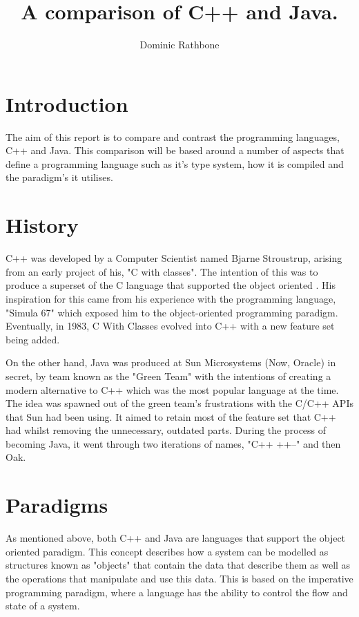 \documentclass[]{report}
\title{A comparison of C++ and Java.}
\author{Dominic Rathbone}
\begin{document}
\maketitle
\section{Introduction}
The aim of this report is to compare and contrast the programming languages, C++ and Java. This comparison will be based around a number of aspects that define a programming language such as it's type system, how it is compiled and the paradigm's it utilises.

\section{History}
C++ was developed by a Computer Scientist named Bjarne Stroustrup, arising from an early project of his, "C with classes". The intention of this was to produce a superset of the C language that supported the object oriented . His inspiration for this came from his experience with the programming language, "Simula 67" which exposed him to the object-oriented programming paradigm. Eventually, in 1983, C With Classes evolved into C++ with a new feature set being added. \cite{HistoryC++}

On the other hand, Java was produced at Sun Microsystems (Now, Oracle) in secret, by team known as the "Green Team" with the intentions of creating a modern alternative to C++ which was the most popular language at the time. The idea was spawned out of the green team's frustrations with the C/C++ APIs that Sun had been using. It aimed to retain most of the feature set that C++ had whilst removing the unnecessary, outdated parts. During the process of becoming Java, it went through two iterations of names, "C++ ++--" and then Oak.\cite{HistoryJava}

\section{Paradigms}
As mentioned above, both C++ and Java are languages that support the object oriented paradigm. This concept describes how a system can be modelled as structures known as "objects" that contain the data that describe them as well as the operations that manipulate and use this data. This is based on the imperative programming paradigm, where a language has the ability to control the flow and state of a system. \cite{Paradigms}
\end{document}
